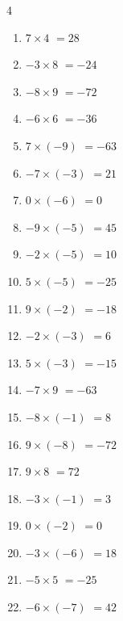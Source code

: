 \begin{multicols}{4}
\begin{enumerate}
  \item $7\times 4$
        $=28$

  \item $-3\times 8$
        $=-24$

  \item $-8\times 9$
        $=-72$

\columnbreak %

  \item $-6\times 6$
        $=-36$

  \item $7\times (-9)$
        $=-63$

  \item $-7\times (-3)$
        $=21$

  \item $0\times (-6)$
        $=0$

  \item $-9\times (-5)$
        $=45$

  \item $-2\times (-5)$
        $=10$

  \item $5\times (-5)$
        $=-25$

  \item $9\times (-2)$
        $=-18$

  \item $-2\times (-3)$
        $=6$

  \item $5\times (-3)$
        $=-15$

  \item $-7\times 9$
        $=-63$

  \item $-8\times (-1)$
        $=8$

  \item $9\times (-8)$
        $=-72$

  \item $9\times 8$
        $=72$

  \item $-3\times (-1)$
        $=3$

  \item $0\times (-2)$
        $=0$

  \item $-3\times (-6)$
        $=18$

  \item $-5\times 5$
        $=-25$

  \item $-6\times (-7)$
        $=42$


\end{enumerate}
\end{multicols}
